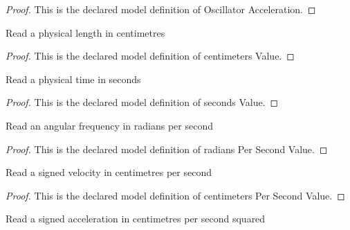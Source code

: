 \begin{proof}
  This is the declared model definition of Oscillator Acceleration.
\end{proof}
\begin{definition}
  \label{def:physics:phyx-mini-0253:phyxminiproblems-problemphyxmini0253-centimetersvalue}
  Read a physical length in centimetres
\end{definition}
\begin{proof}
  This is the declared model definition of centimeters Value.
\end{proof}
\begin{definition}
  \label{def:physics:phyx-mini-0253:phyxminiproblems-problemphyxmini0253-secondsvalue}
  Read a physical time in seconds
\end{definition}
\begin{proof}
  This is the declared model definition of seconds Value.
\end{proof}
\begin{definition}
  \label{def:physics:phyx-mini-0253:phyxminiproblems-problemphyxmini0253-radianspersecondvalue}
  Read an angular frequency in radians per second
\end{definition}
\begin{proof}
  This is the declared model definition of radians Per Second Value.
\end{proof}
\begin{definition}
  \label{def:physics:phyx-mini-0253:phyxminiproblems-problemphyxmini0253-centimeterspersecondvalue}
  Read a signed velocity in centimetres per second
\end{definition}
\begin{proof}
  This is the declared model definition of centimeters Per Second Value.
\end{proof}
\begin{definition}
  \label{def:physics:phyx-mini-0253:phyxminiproblems-problemphyxmini0253-centimeterspersecondsquaredvalue}
  Read a signed acceleration in centimetres per second squared
\end{definition}
